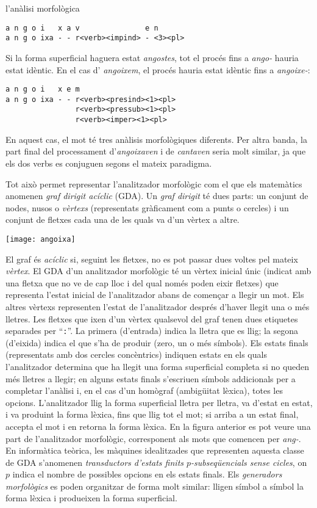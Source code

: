 \begin{persabermes}{l'anàlisi morfològica}
\begin{verbatim}
a n g o i   x a v               e n
a n g o ixa - - r<verb><impind> - <3><pl>
\end{verbatim}
Si la forma superficial haguera    estat \emph{angostes}, tot el
procés fins a \emph{ango-} hauria estat idèntic. En el cas d'{\em
  angoixem}, el procés hauria estat idèntic fins a {\em
  angoixe-}:
\begin{verbatim}
a n g o i   x e m
a n g o ixa - - r<verb><presind><1><pl>
                r<verb><pressub><1><pl>
                r<verb><imper><1><pl> 
\end{verbatim}
En aquest cas, el mot té tres anàlisis morfològiques diferents.
Per altra banda, la part final del processament d'\emph{angoixaven} i
de \emph{cantaven} seria molt similar, ja que els dos verbs es
conjuguen segons el mateix paradigma. 


Tot això permet representar l'analitzador morfològic com el que els
matemà\-tics anomenen \emph{graf dirigit acíclic} (GDA). Un \emph{graf
  dirigit} té dues parts: un conjunt de nodes, nusos o \emph{vèrtexs}
(representats gràficament com a punts o cercles) i un conjunt de
fletxes cada una de les quals va d'un vèrtex a altre. 

\texttt{[image: angoixa]}


El graf és {\em
  acíclic} si, seguint les fletxes, no es pot passar dues voltes pel
mateix \emph{vèrtex}. El GDA d'un analitzador morfològic té un vèrtex
inicial únic (indicat amb una fletxa que no ve de cap lloc i del qual
només poden eixir fletxes) que representa l'estat inicial de
l'analitzador abans de començar a llegir un mot. Els altres vèrtexs
representen l'estat de l'analitzador després d'haver llegit una o més
lletres. Les fletxes que ixen d'un vèrtex qualsevol del graf tenen
dues etiquetes separades per ``{\tt :}''. La primera (d'entrada)
indica la lletra que es llig; la segona (d'eixida) indica el que s'ha
de produir (zero, un o més símbols). Els estats finals (representats
amb dos cercles concèntrics) indiquen estats en els quals
l'analitzador determina que ha llegit una forma superficial completa
si no queden més lletres a llegir; en alguns estats finals s'escriuen
símbols addicionals per a completar l'anàlisi i, en el cas d'un
homògraf (ambigüitat lèxica), totes les opcions. L'analitzador llig la
forma superficial lletra per lletra, va d'estat en estat, i va
produint la forma lèxica, fins que llig tot el mot; si arriba a un
estat final, accepta el mot i en retorna la forma lèxica. En la
figura anterior es pot veure una part de l'analitzador morfològic,
corresponent als mots que comencen per \emph{ang-}. En informàtica
teòrica, les màquines idealitzades que representen aquesta classe de
GDA s'anomenen \emph{transductors d'estats finits $p$-subseqüencials
  sense cicles}, on $p$ indica el nombre de possibles opcions en els
estats finals. Els \emph{generadors morfològics} es poden organitzar
de forma molt similar: lligen símbol a símbol la forma lèxica i
produeixen la forma superficial.


\end{persabermes}
